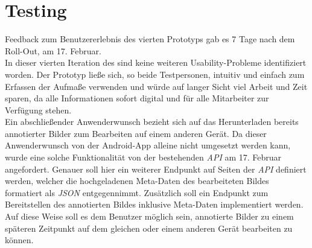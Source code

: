 \section{Testing}
Feedback zum Benutzererlebnis des vierten Prototyps gab es 7 Tage nach dem Roll-Out, am 17. Februar. \\

In dieser vierten Iteration des \hcdp{} sind keine weiteren Usability-Probleme identifiziert worden.
Der Prototyp ließe sich, so beide Testpersonen, intuitiv und einfach zum Erfassen der Aufmaße verwenden und würde auf langer Sicht viel Arbeit und Zeit sparen, da alle Informationen sofort digital und für alle Mitarbeiter zur Verfügung stehen. \\

Ein abschließender Anwenderwunsch bezieht sich auf das  Herunterladen bereits annotierter Bilder zum Bearbeiten auf einem anderen Gerät.
Da dieser Anwenderwunsch von der Android-App alleine nicht umgesetzt werden kann, wurde eine solche Funktionalität von der bestehenden \emph{API} am 17. Februar angefordert.
Genauer soll hier ein weiterer Endpunkt auf Seiten der \emph{API} definiert werden, welcher die hochgeladenen Meta-Daten des bearbeiteten Bildes formatiert als \emph{JSON} entgegennimmt.
Zusätzlich soll ein Endpunkt zum Bereitstellen des annotierten Bildes inklusive Meta-Daten implementiert werden. 
Auf diese Weise soll es dem Benutzer möglich sein, annotierte Bilder zu einem späteren Zeitpunkt auf dem gleichen oder einem anderen Gerät bearbeiten zu können.

